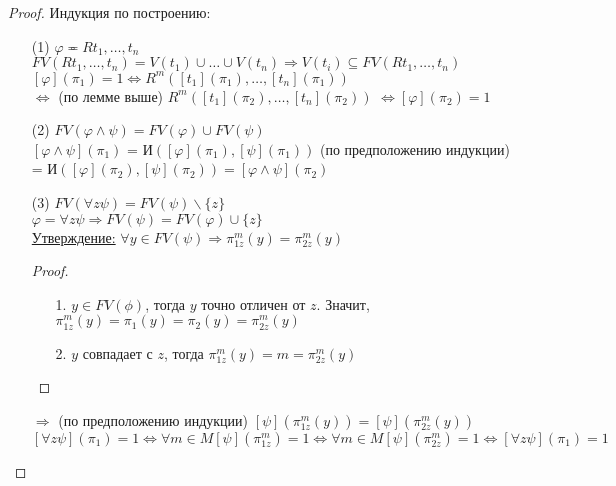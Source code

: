 \documentclass[a4paper, fleqn]{article}
\begin{document}
    \begin{proof}
        Индукция по построению: 
        \begin{itemize}
            \item[(1)] $\varphi \eqcirc Rt_1, \ldots, t_n$\\
            $FV(Rt_1, \ldots, t_n) = V(t_1) ∪ \ldots  ∪ V(t_n) ⇒
            V(t_i) ⊆ FV(Rt_1, \ldots, t_n)$  \\
            $[\varphi](\pi_1) = 1 ⇔ R^m([t_1](\pi_1), \ldots, [t_n](\pi_1))$
             \\
            $⇔$ (по лемме выше) $R^m([t_1](\pi_2), \ldots, [t_n](\pi_2))$
            $⇔ [\varphi](\pi_2) = 1$
            \item[(2)] 
            $FV(\varphi  ∧ \psi) = FV(\varphi) ∪ FV(\psi)$ \\
            $[\varphi  ∧ \psi](\pi_1)$ = И$([\varphi](\pi_1), [\psi](\pi_1)) 
            $ (по предположению индукции) = И$([\varphi](\pi_2), [\psi](\pi_2))
            = [\varphi  ∧ \psi](\pi_2)$
            \item[(3)]
            $FV(∀ z \psi) = FV(\psi) \backslash \{z\}$ \\  
            $\varphi=∀ z \psi ⇒ FV(\psi) = FV(\varphi) ∪ \{z\}$  \\

            \underline{Утверждение:} $∀ y ∈ FV(\psi) ⇒ \pi_{1 z}^m(y) = \pi_{2 z}^m(y)$
            \begin{proof} \ \\
                \begin{itemize} 
                    \item[1.] $y ∈ FV(\phi)$, тогда $y$ точно отличен от $z$. Значит,
                     $\pi_{1 z}^m(y) = \pi_1(y) = \pi_2(y) = \pi_{2 z}^m(y)$
                     \item[2.] $y$ совпадает с $z$, тогда
                     $\pi_{1 z}^m(y) = m = \pi_{2 z}^m(y)$  
                \end{itemize}   
            \end{proof}
            $⇒$ (по предположению индукции) 
            $[\psi](\pi_{1 z}^m(y)) = [\psi](\pi_{2 z}^m(y))$ \\[9.5pt]
            $[∀ z \psi](\pi_1) = 1 ⇔ ∀ m ∈ M [\psi](\pi_{1 z}^m) = 1
            ⇔ ∀ m ∈ M [\psi](\pi_{2 z}^m) = 1 ⇔ [∀ z \psi](\pi_1) = 1$
        \end{itemize}
    \end{proof}
\end{document}
